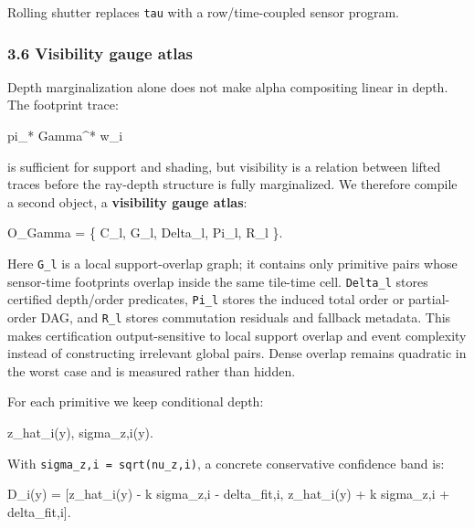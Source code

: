 \documentclass[
]{article}
\newenvironment{Shaded}{}{}
\newcommand{\NormalTok}[1]{#1}
\begin{document}
Rolling shutter replaces \texttt{tau} with a row/time-coupled sensor
program.

\subsubsection{3.6 Visibility gauge atlas}\label{visibility-gauge-atlas}

Depth marginalization alone does not make alpha compositing linear in
depth. The footprint trace:

\begin{Shaded}
\begin{Highlighting}[]
\NormalTok{pi\_* Gamma\^{}* w\_i}
\end{Highlighting}
\end{Shaded}

is sufficient for support and shading, but visibility is a relation
between lifted traces before the ray-depth structure is fully
marginalized. We therefore compile a second object, a \textbf{visibility
gauge atlas}:

\begin{Shaded}
\begin{Highlighting}[]
\NormalTok{O\_Gamma = \{ C\_l, G\_l, Delta\_l, Pi\_l, R\_l \}.}
\end{Highlighting}
\end{Shaded}

Here \texttt{G\_l} is a local support-overlap graph; it contains only
primitive pairs whose sensor-time footprints overlap inside the same
tile-time cell. \texttt{Delta\_l} stores certified depth/order
predicates, \texttt{Pi\_l} stores the induced total order or
partial-order DAG, and \texttt{R\_l} stores commutation residuals and
fallback metadata. This makes certification output-sensitive to local
support overlap and event complexity instead of constructing irrelevant
global pairs. Dense overlap remains quadratic in the worst case and is
measured rather than hidden.

For each primitive we keep conditional depth:

\begin{Shaded}
\begin{Highlighting}[]
\NormalTok{z\_hat\_i(y),    sigma\_z,i(y).}
\end{Highlighting}
\end{Shaded}

With \texttt{sigma\_z,i\ =\ sqrt(nu\_z,i)}, a concrete conservative
confidence band is:

\begin{Shaded}
\begin{Highlighting}[]
\NormalTok{D\_i(y) =}
\NormalTok{  [z\_hat\_i(y) {-} k sigma\_z,i {-} delta\_fit,i,}
\NormalTok{   z\_hat\_i(y) + k sigma\_z,i + delta\_fit,i].}
\end{Highlighting}
\end{Shaded}
\end{document}
